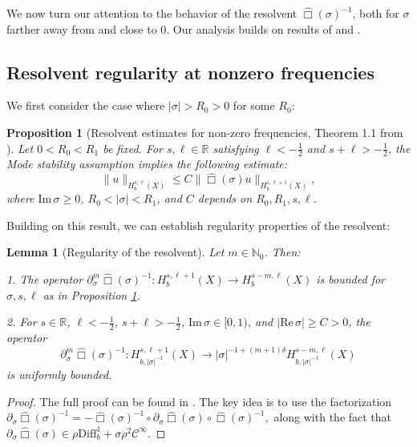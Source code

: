 \documentclass[10pt,a4paper,reqno]{amsart}
\renewcommand{\Im}{\operatorname{Im}}
\renewcommand{\Re}{\operatorname{Re}}
\renewcommand\Re{\operatorname{Re}}
\newtheorem{lemma}[theorem]{Lemma}
\newtheorem{proposition}[theorem]{Proposition}
\theoremstyle{definition}
\theoremstyle{remark}
\numberwithin{equation}{section}
\renewcommand{\Re}{\mathrm{Re}\,}
\renewcommand{\Im}{\mathrm{Im}\,}
\newcommand{\wh}{\widehat}
\begin{document}
We now turn our attention to the behavior of the resolvent $\wh\Box(\sigma)^{-1}$, both for $\sigma$ farther away from and close to 0. Our analysis builds on results of \cite{Hin22} and \cite{VasyLAPLag,VasyLowEnergyLag}.

\subsection{Resolvent regularity at nonzero frequencies} We first consider the case where $|\sigma| > R_0 > 0$ for some $R_0$:

\begin{proposition}[Resolvent estimates for non-zero frequencies, Theorem 1.1 from \cite{VasyLAPLag}]
\label{prop:nonzero_freq}
Let $0 < R_0 < R_1$ be fixed. For $s, \ell \in \mathbb{R}$ satisfying $\ell < -\frac{1}{2}$ and $s + \ell > -\frac{1}{2}$, the Mode stability assumption implies the following estimate:
\begin{equation}
\label{eq:medium_energy}
\|u\|_{{H}_b^{s,\ell}(X)} \leq C\|\wh\Box(\sigma)u\|_{{H}_b^{s,\ell+1}(X)},
\end{equation}
where $\Im\sigma \geq 0$, $R_0 < |\sigma| < R_1$, and $C$ depends on $R_0, R_1, s, \ell$.
\end{proposition}

Building on this result, we can establish regularity properties of the resolvent:

\begin{lemma}[Regularity of the resolvent]
\label{lem:resolvent_regularity}
Let $m \in \mathbb{N}_0$. Then:

1. The operator $\partial_\sigma^m\wh\Box(\sigma)^{-1}: H_b^{s,\ell+1}(X) \to H_b^{s-m,\ell}(X)$ is bounded for $\sigma, s, \ell$ as in Proposition \ref{prop:nonzero_freq}.

2. For $s \in \mathbb{R}$, $\ell < -\frac{1}{2}$, $s + \ell > -\frac{1}{2}$, $\Im \sigma \in [0,1)$, and $|\Re\sigma| \geq C > 0$, the operator
\[
\partial_\sigma^m\wh\Box(\sigma)^{-1}: H_{b,|\sigma|^{-1}}^{s,\ell+1}(X) \to |\sigma|^{-1+(m+1)\delta} H_{b,|\sigma|^{-1}}^{s-m,\ell}(X)
\]
is uniformly bounded.
\end{lemma}

\begin{proof}
The full proof can be found in \cite[Lemma 2.10]{Hin22}. The key idea is to use the factorization $\partial_\sigma\wh\Box(\sigma)^{-1} = -\wh\Box(\sigma)^{-1} \circ \partial_\sigma\wh\Box(\sigma) \circ \wh\Box(\sigma)^{-1},$
along with the fact that $\partial_\sigma\wh\Box(\sigma) \in \rho\text{Diff}_b^1 + \sigma\rho^2\mathcal{C}^\infty$.
\end{proof}
\end{document}
